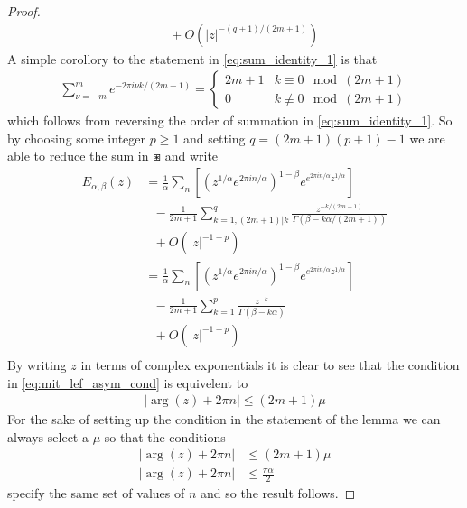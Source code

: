 \begin{proof}
\begin{align}
    & \ \ \ + O\left(|z|^{-(q+1)/(2m+1)} \right)
    \end{align}
    A simple corollory to the statement in \eqref{eq:sum_identity_1} is that
    \begin{align}
        \sum_{\nu = -m}^{m} e^{-2\pi i \nu k / (2m + 1)} = 
        \begin{cases}
            2m+1    & k \equiv 0 \mod (2m + 1) \\
            0       & k \not\equiv 0 \mod (2m + 1) 
        \end{cases}
    \end{align}
    which follows from reversing the order of summation in \eqref{eq:sum_identity_1}. So by choosing some integer $ p \geq 1 $ and setting $ q = (2m+1)(p+1) - 1 $ we are able to reduce the sum in $ \boxast $ and write
     \begin{align}
        E_{\alpha, \beta}(z) &= \frac{1}{\alpha} \sum_{n} \left[ \left(z^{1 / \alpha} e^{2\pi i n / \alpha} \right)^{1-\beta} e^{e^{2\pi i n / \alpha}z^{1 / \alpha} }\right] \\ 
    & \ \ \ - \frac{1}{2m + 1} \sum_{k=1, (2m+1) | k}^q \frac{z^{-k/(2m + 1)}}{\Gamma(\beta - k\alpha / (2m + 1))} \\ 
    & \ \ \ + O\left(|z|^{-1-p} \right) \\
    &= \frac{1}{\alpha} \sum_{n} \left[ \left(z^{1 / \alpha} e^{2\pi i n / \alpha} \right)^{1-\beta} e^{e^{2\pi i n / \alpha}z^{1 / \alpha} }\right] \\ 
    & \ \ \ - \frac{1}{2m + 1} \sum_{k=1}^p \frac{z^{-k}}{\Gamma(\beta - k\alpha)} \\ 
    & \ \ \ + O\left(|z|^{-1-p} \right) \\
    \end{align}  
    By writing $ z $ in terms of complex exponentials it is clear to see that the condition in \eqref{eq:mit_lef_asym_cond} is equivelent to
    \begin{align}
        \left| \arg(z) + 2\pi n \right| \leq (2m + 1)\mu
    \end{align}
    For the sake of setting up the condition in the statement of the lemma we can always select a $ \mu $ so that the conditions
    \begin{align}
        | \arg(z) + 2\pi n| &\leq (2m + 1) \mu \\
        | \arg(z) + 2\pi n| &\leq \frac{\pi \alpha}{2}
    \end{align}
    specify the same set of values of $ n $ and so the result follows. 
\end{proof}
